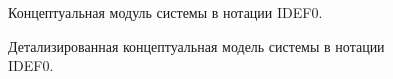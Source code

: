 \documentclass[a4paper, 12pt]{article}
\begin{document}
\begin{large}
\newpage
\begin{landscape}
	\begin{figure}[h!]
		\caption{Концептуальная модуль системы в нотации IDEF0.}
		\label{fig:idef0-1}
	\end{figure}

	\begin{figure}[h!]
		\caption{Детализированная концептуальная модель системы в нотации IDEF0.}
		\label{fig:idef0-2}
	\end{figure}
\end{landscape}



\end{large}
\end{document}
